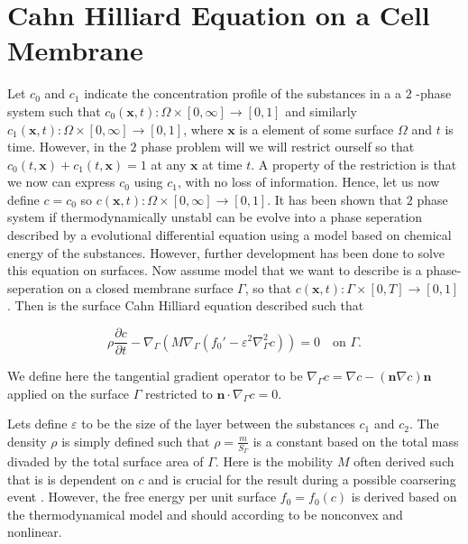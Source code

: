 


\newpage
\section{Cahn Hilliard Equation on a Cell Membrane }%
\label{sec:cahn_hilliard_equation}


Let $c_0$ and $c_1$  indicate the concentration profile of the substances in a a $2$ -phase system such
that $c_0 \left( \mathbf{x},t \right): \Omega  \times \left[ 0, \infty \right] \to \left[ 0,1 \right]$ and
similarly $c_1 \left( \mathbf{x},t \right): \Omega \times \left[ 0, \infty \right] \to \left[ 0,1 \right]$, where
$\mathbf{x} $ is a element of some surface $\Omega $ and $t$ is time.
However, in the $2$ phase problem will we will restrict ourself so that $c_0\left( t,\mathbf{x} \right) + c_1\left( t,
\mathbf{x} \right) = 1$ at any $\mathbf{x} $ at time $t$. A property of the restriction is that we now can express
$c_0$ using $c_1$, with no loss of information. Hence, let us now define $c = c_0$ so $c \left( \mathbf{x},t \right):
\Omega  \times \left[ 0, \infty \right] \to \left[ 0,1 \right]$. It has been shown that $2$ phase system if
thermodynamically unstabl can be evolve
into a phase seperation
described by a evolutional differential equation \cite{cahnhilliard1957} using a model based on chemical energy of the
substances. However, further development has been done \cite{yushutin19} to solve this equation on surfaces. Now assume
model that we want to describe is a phase-seperation on a closed membrane surface $\Gamma $, so that $c \left( \mathbf{x},t \right):
\Gamma \times \left[ 0, T \right] \to \left[ 0,1 \right]$. Then is the surface Cahn Hilliard equation described such that

\begin{equation}
    \label{eq:cahn1}
\rho \frac{\partial c}{\partial  t}  - \nabla_{\Gamma } \left( M \nabla _{\Gamma } \left( f_{0}'  - \varepsilon ^2
        \nabla^2
_{\Gamma } c \right) \right) = 0  \quad \text{on } \Gamma
.\end{equation}

We define here the tangential gradient operator to be $\nabla _{\Gamma } c = \nabla c - \left( \mathbf{n} \nabla c
\right)\mathbf{n} $ applied on the surface $\Gamma $ restricted to $\mathbf{n} \cdot \nabla _{\Gamma } c = 0$.

Lets define $\varepsilon $ to be the size of the layer between the substances $c_{1}$ and $c_{2}$. The density $\rho $ is
simply defined such that $\rho = \frac{m}{S_{\Gamma }}$ is a constant based on the total mass divaded by the total
surface area of $\Gamma $.
Here is the mobility $M$ often derived such that is is dependent on $c$ and is crucial for the result during a possible
coarsering event \cite{yushutin19}.  However, the free energy per unit surface
$f_{0} = f_{0}\left( c \right)$ is derived based on the thermodynamical model and should according to \cite{yushutin19} be nonconvex and
nonlinear.

